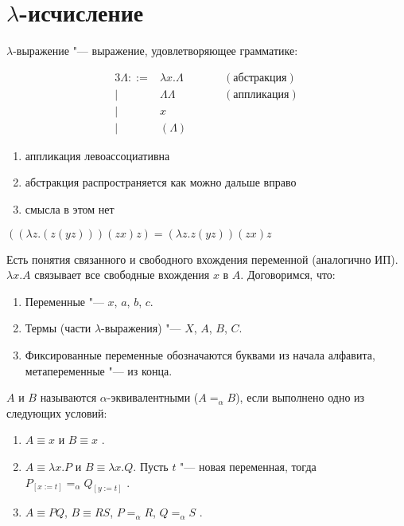 \section{$\lambda$-исчисление}

\begin{definition}
    $\lambda$-выражение "--- выражение, удовлетворяющее грамматике:
    \begin{bnf}
    \begin{alignat*}{3}
        \Lambda ::= & \lambda{}x.\Lambda{} \qquad && (абстракция) \\
                  | & \Lambda{}\Lambda{}          && (аппликация) \\
                  | & x                                           \\
                  | & \left(\Lambda\right)
    \end{alignat*}
    \end{bnf}
    \begin{enumerate}[label=(\alph*)]
        \item аппликация левоассоциативна
        \item абстракция распространяется как можно дальше вправо
        \item смысла в этом нет
    \end{enumerate}
\end{definition}

\begin{example}
    $((\lambda{} z.(z (y z))) (z x) z) = (\lambda{} z.z (y z)) (z x) z$
\end{example}

Есть понятия связанного и свободного вхождения переменной (аналогично ИП).
$\lambda{}x.A$ связывает все свободные вхождения $x$ в $A$.
Договоримся, что:
\begin{enumerate}[label=(\alph*)]
    \item Переменные "--- $x$, $a$, $b$, $c$.
    \item Термы (части $\lambda$-выражения) "--- $X$, $A$, $B$, $C$.
    \item Фиксированные переменные обозначаются буквами из начала алфавита, метапеременные "--- из конца.
\end{enumerate}

\begin{definition}
    $A$ и $B$ называются $\alpha$-эквивалентными ($A=_{\alpha}B$), если выполнено одно из следующих условий:
    \begin{enumerate}
        \item $A\equiv{}x$ и $B\equiv{}x$ .
        \item $A\equiv{}\lambda{}x.P$ и $B\equiv{}\lambda{}x.Q$. Пусть $t$ "--- новая переменная, тогда
            $P_{[x:=t]}=_{\alpha}Q_{[y:=t]}$ .
        \item $A\equiv{}PQ$, $B\equiv{}RS$, $P=_{\alpha}R$, $Q=_{\alpha}S$ .
    \end{enumerate}
\end{definition}

